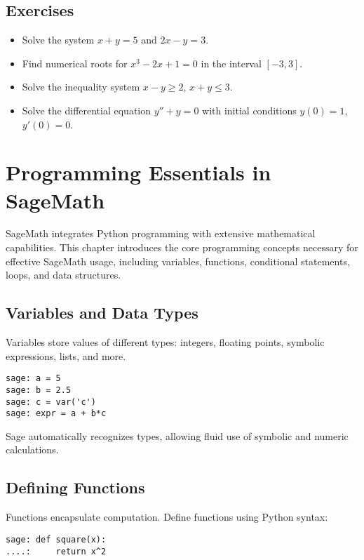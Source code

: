 \documentclass[12pt]{book}
\begin{document}
\section{Exercises}

\begin{itemize}
  \item Solve the system \( x + y = 5 \) and \( 2x - y = 3 \).
  \item Find numerical roots for \( x^3 - 2x + 1 = 0 \) in the interval \([-3, 3]\).
  \item Solve the inequality system \( x - y \geq 2 \), \( x + y \leq 3 \).
  \item Solve the differential equation \( y'' + y = 0 \) with initial conditions \( y(0) = 1 \), \( y'(0) = 0 \).
\end{itemize}

\chapter{Programming Essentials in SageMath}

SageMath integrates Python programming with extensive mathematical capabilities. This chapter introduces the core programming concepts necessary for effective SageMath usage, including variables, functions, conditional statements, loops, and data structures.

\section{Variables and Data Types}

Variables store values of different types: integers, floating points, symbolic expressions, lists, and more.

\begin{verbatim}
sage: a = 5
sage: b = 2.5
sage: c = var('c')
sage: expr = a + b*c
\end{verbatim}

Sage automatically recognizes types, allowing fluid use of symbolic and numeric calculations.

\section{Defining Functions}

Functions encapsulate computation. Define functions using Python syntax:

\begin{verbatim}
sage: def square(x):
....:     return x^2
\end{verbatim}
\end{document}
